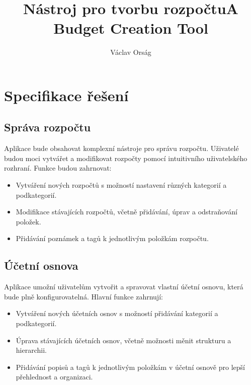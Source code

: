 \documentclass[
program=itk,
biblatex,
language=czech,
font=sans,
figures=false,
tables=false,
theorems,
sourcecodes,
glossaries,
index
]{kidiplom}
\title{Nástroj pro tvorbu rozpočtu}
\title[english]{A Budget Creation Tool}
\author{Václav Orság}
\begin{document}
\maketitle



\newcommand{\BibLaTeX}{\textsc{Bib}\LaTeX}

\section{Specifikace řešení}

\subsection{Správa rozpočtu}
Aplikace bude obsahovat komplexní nástroje pro správu rozpočtu. Uživatelé budou moci vytvářet a modifikovat rozpočty pomocí intuitivního uživatelského rozhraní. Funkce budou zahrnovat:
\begin{itemize}
  \item Vytváření nových rozpočtů s možností nastavení různých kategorií a podkategorií.
  \item Modifikace stávajících rozpočtů, včetně přidávání, úprav a odstraňování položek.
  \item Přidávání poznámek a tagů k jednotlivým položkám rozpočtu.
\end{itemize}

\subsection{Účetní osnova}
Aplikace umožní uživatelům vytvořit a spravovat vlastní účetní osnovu, která bude plně konfigurovatelná. Hlavní funkce zahrnují:
\begin{itemize}
  \item Vytváření nových účetních osnov s možností přidávání kategorií a podkategorií.
  \item Úprava stávajících účetních osnov, včetně možnosti měnit strukturu a hierarchii.
  \item Přidávání popisů a tagů k jednotlivým položkám v účetní osnově pro lepší přehlednost a organizaci.
\end{itemize}
\end{document}
